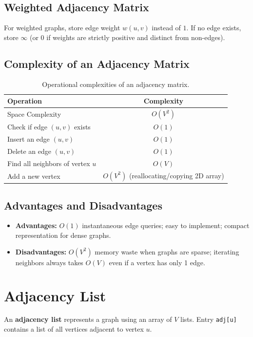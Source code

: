 \subsection{Weighted Adjacency Matrix}
For weighted graphs, store edge weight $w(u, v)$ instead of $1$. If no edge exists, store $\infty$ (or $0$ if weights are strictly positive and distinct from non-edges).

\subsection{Complexity of an Adjacency Matrix}

\begin{table}[htbp]
\centering
\small
\begin{tabularx}{\textwidth}{X c}
\toprule
\textbf{Operation} & \textbf{Complexity} \\
\midrule
Space Complexity & $O(V^2)$ \\
Check if edge $(u, v)$ exists & $O(1)$ \\
Insert an edge $(u, v)$ & $O(1)$ \\
Delete an edge $(u, v)$ & $O(1)$ \\
Find all neighbors of vertex $u$ & $O(V)$ \\
Add a new vertex & $O(V^2)$ (reallocating/copying 2D array) \\
\bottomrule
\end{tabularx}
\caption{Operational complexities of an adjacency matrix.}
\end{table}

\subsection{Advantages and Disadvantages}
\begin{itemize}
    \item \textbf{Advantages:} $O(1)$ instantaneous edge queries; easy to implement; compact representation for dense graphs.
    \item \textbf{Disadvantages:} $O(V^2)$ memory waste when graphs are sparse; iterating neighbors always takes $O(V)$ even if a vertex has only 1 edge.
\end{itemize}

\section{Adjacency List}

An \textbf{adjacency list} represents a graph using an array of $V$ lists. Entry \texttt{adj[u]} contains a list of all vertices adjacent to vertex $u$.

